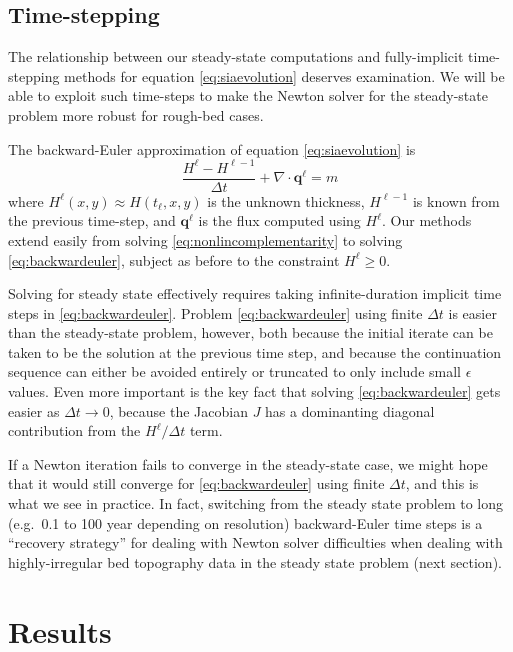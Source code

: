 \documentclass[review,letterpaper]{igs}
\newcommand\bq{\mathbf{q}}
\newcommand{\Div}{\nabla\cdot}
\newcommand\eps{\epsilon}
\begin{document}
\subsection{Time-stepping}

The relationship between our steady-state computations and fully-implicit time-stepping methods for equation \eqref{eq:siaevolution} deserves examination.  We will be able to exploit such time-steps to make the Newton solver for the steady-state problem more robust for rough-bed cases.

The backward-Euler \citep{MortonMayers2005} approximation of equation \eqref{eq:siaevolution} is
\begin{equation}
\frac{H^\ell - H^{\ell-1}}{\Delta t} + \Div \bq^\ell = m \label{eq:backwardeuler}
\end{equation}
where $H^\ell(x,y) \approx H(t_\ell,x,y)$ is the unknown thickness, $H^{\ell-1}$ is known from the previous time-step, and $\bq^\ell$ is the flux computed using $H^\ell$.  Our methods extend easily from solving \eqref{eq:nonlincomplementarity} to solving \eqref{eq:backwardeuler}, subject as before to the constraint $H^\ell\ge 0$.

Solving for steady state effectively requires taking infinite-duration implicit time steps in \eqref{eq:backwardeuler}.  Problem \eqref{eq:backwardeuler} using finite $\Delta t$ is easier than the steady-state problem, however, both because the initial iterate can be taken to be the solution at the previous time step, and because the continuation sequence can either be avoided entirely or truncated to only include small $\eps$ values.  Even more important is the key fact that solving \eqref{eq:backwardeuler} gets easier as $\Delta t\to 0$, because the Jacobian $J$ has a dominanting diagonal contribution from the $H^\ell/\Delta t$ term.

If a Newton iteration fails to converge in the steady-state case, we might hope that it would still converge for \eqref{eq:backwardeuler} using finite $\Delta t$, and this is what we see in practice.  In fact, switching from the steady state problem to long (e.g.~0.1 to 100 year depending on resolution) backward-Euler time steps is a ``recovery strategy'' for dealing with Newton solver difficulties when dealing with highly-irregular bed topography data in the steady state problem (next section).


\section{Results}
\end{document}

